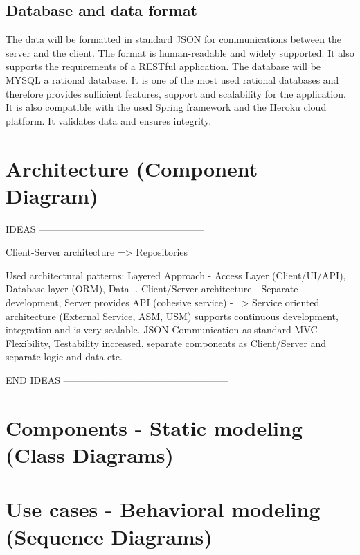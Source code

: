 \documentclass[a4paper,11pt]{article}
\begin{document}
\subsection{Database and data format}
The data will be formatted in standard JSON for communications between the server and the client. The format is human-readable and widely supported. It also supports the requirements of a RESTful application.
\newline
\newline
\noindent
The database will be MYSQL a rational database.
It is one of the most used rational databases and therefore provides sufficient features, support and scalability for the application. It is also compatible with the used Spring framework and the Heroku cloud platform. It validates data and ensures integrity.

\section{Architecture (Component Diagram)}

IDEAS ---------------------------------------------------

Client-Server architecture => Repositories


Used architectural patterns:
Layered Approach
	- Access Layer (Client/UI/API), Database layer (ORM), Data ..
Client/Server architecture
	- Separate development, Server provides API (cohesive service)
	- ~> Service oriented architecture (External Service, ASM, USM) supports continuous development, integration and is very scalable. JSON Communication as standard
MVC
	- Flexibility, Testability increased, separate components as Client/Server and separate logic and data etc.

END IDEAS ---------------------------------------------------

\section{Components - Static modeling (Class Diagrams)}

\section{Use cases - Behavioral modeling (Sequence Diagrams)}
\end{document}
